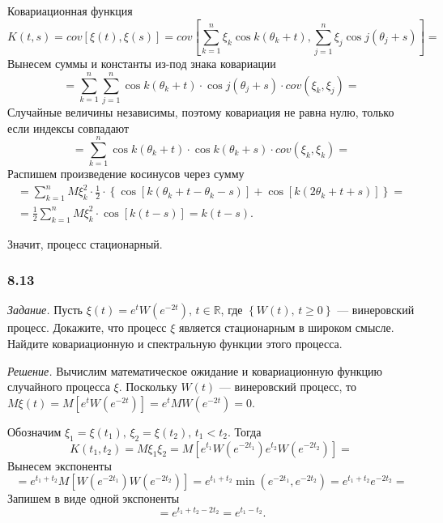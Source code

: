 Ковариационная функция
$$K \left( t, s \right) =
  cov \left[ \xi \left( t \right), \xi \left( s \right) \right] =
  cov \left[
    \sum \limits_{k = 1}^n \xi_k \cos k \left( \theta_k + t \right),
    \sum \limits_{j = 1}^n \xi_j \cos j \left( \theta_j + s \right) \right] =$$
Вынесем суммы и константы из-под знака ковариации
$$= \sum \limits_{k = 1}^n
    \sum \limits_{j = 1}^n
      \cos k \left( \theta_k + t \right) \cdot
      \cos j \left( \theta_j + s \right) \cdot cov \left( \xi_k, \xi_j \right) =$$
Случайные величины независимы, поэтому ковариация не равна нулю, только если индексы совпадают
$$= \sum \limits_{k = 1}^n
    \cos k \left( \theta_k + t \right) \cdot \cos k \left( \theta_k + s \right) \cdot
    cov \left( \xi_k, \xi_k \right) =$$
Распишем произведение косинусов через сумму
\begin{gather*}
  = \sum \limits_{k = 1}^n
    M \xi_k^2 \cdot \frac{1}{2} \cdot
    \left\{
      \cos \left[ k \left( \theta_k + t - \theta_k - s \right) \right] +
      \cos \left[ k \left( 2 \theta_k + t + s \right) \right] \right\} = \\
  = \frac{1}{2} \sum \limits_{k = 1}^n M \xi_k^2 \cdot \cos \left[ k \left( t - s \right) \right] =
  k \left( t - s \right).
\end{gather*}

Значит, процесс стационарный.

\subsubsection*{8.13}

\textit{Задание.}
Пусть $ \xi \left( t \right) = e^t W \left( e^{-2t} \right), \, t \in \mathbb{R}$,
где $ \left\{ W \left( t \right), \, t \geq 0 \right\} $ --- винеровский процесс.
Докажите, что процесс $ \xi $ является стационарным в широком смысле.
Найдите ковариационную и спектральную функции этого процесса.

\textit{Решение.}
Вычислим математическое ожидание и ковариационную функцию случайного процесса $ \xi $.
Поскольку $W \left( t \right) $ --- винеровский процесс, то
$M \xi \left( t \right) =
  M \left[ e^t W \left( e^{-2t} \right) \right] =
  e^t MW \left( e^{-2t} \right) =
  0$.

Обозначим $ \xi_1 = \xi \left( t_1 \right), \, \xi_2 = \xi \left( t_2 \right), \, t_1 < t_2$.
Тогда
$$K \left( t_1, t_2 \right) =
  M \xi_1 \xi_2 =
  M \left[ e^{t_1} W \left( e^{-2t_1} \right) e^{t_2} W \left( e^{-2t_2} \right) \right] =$$
Вынесем экспоненты
$$= e^{t_1 + t_2} M \left[ W \left( e^{-2t_1} \right) W \left( e^{-2t_2} \right) \right] =
  e^{t_1 + t_2} \min \left( e^{-2t_1}, e^{-2t_2} \right) =
  e^{t_1 + t_2} e^{-2t_2} =$$
Запишем в виде одной экспоненты
$$= e^{t_1 + t_2 - 2t_2} =
  e^{t_1 - t_2}.$$

